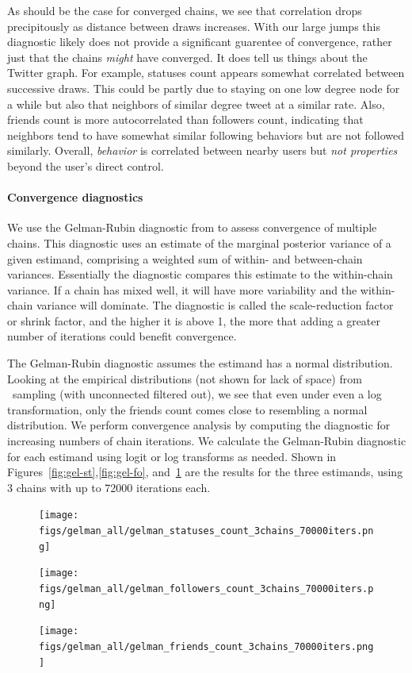 As should be the case for converged chains, we see that correlation
drops precipitously as distance between draws increases. With our
large jumps this diagnostic likely does not provide a significant
guarentee of convergence, rather just that the chains \emph{might}
have converged.  It does tell us things about the Twitter graph. For
example, statuses count appears somewhat correlated between successive
draws. This could be partly due to staying on one low degree node for
a while but also that neighbors of similar degree tweet at a similar
rate. Also, friends count is more autocorrelated than followers count,
indicating that neighbors tend to have somewhat similar following
behaviors but are not followed similarly. Overall, \emph{behavior} is
correlated between nearby users but \emph{not properties} beyond the
user's direct control.

\paragraph{Convergence diagnostics}

We use the Gelman-Rubin diagnostic from \cite{Gelman:2003} to assess
convergence of multiple chains. This diagnostic uses an estimate of
the marginal posterior variance of a given estimand, comprising a
weighted sum of within- and between-chain variances. Essentially the
diagnostic compares this estimate to the within-chain variance. If a
chain has mixed well, it will have more variability and the
within-chain variance will dominate. The diagnostic is called the
scale-reduction factor or shrink factor, and the higher it is above 1,
the more that adding a greater number of iterations could benefit
convergence.

The Gelman-Rubin diagnostic assumes the estimand has a normal
distribution. Looking at the empirical distributions (not shown for
lack of space) from \id~sampling (with unconnected filtered out), we
see that even under even a log transformation, only the friends count comes
close to resembling a normal distribution. We perform convergence
analysis by computing the diagnostic for increasing numbers of chain
iterations. We calculate the Gelman-Rubin diagnostic for each estimand
using logit or log transforms as needed. Shown in
Figures~\ref{fig:gel-st},\ref{fig:gel-fo}, and~\ref{fig:gel-fr} are
the results for
the three estimands, using 3 chains with up to 72000 iterations each.  

\begin{figure}[htb]
      \texttt{[image: figs/gelman\_all/gelman\_statuses\_count\_3chains\_70000iters.png]}
      \caption{Gelman-Rubin diagnostic for increasing iterations.
          Chains are said to converge when the diagnostic settles
          close to 1.}
\label{fig:gel-st}
    \endminipage\hfill
      \texttt{[image: figs/gelman\_all/gelman\_followers\_count\_3chains\_70000iters.png]}
    \caption{}
\label{fig:gel-fo}
    \endminipage
      \texttt{[image: figs/gelman\_all/gelman\_friends\_count\_3chains\_70000iters.png]}
      \caption{}
\label{fig:gel-fr}
    \endminipage\hfill
\end{figure}

